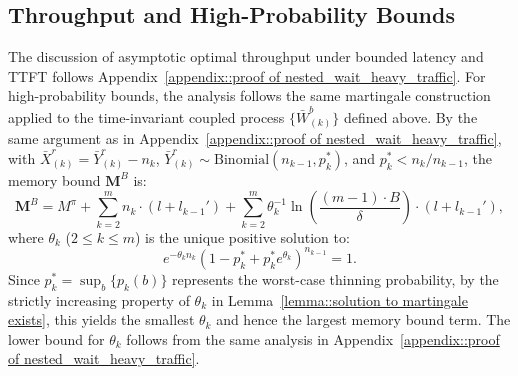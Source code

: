 \subsection{Throughput and High-Probability Bounds}

The discussion of asymptotic optimal throughput under bounded latency and TTFT follows Appendix~\ref{appendix::proof of nested_wait_heavy_traffic}. For high-probability bounds, the analysis follows the same martingale construction applied to the time-invariant coupled process $\{ \bar{W}_{(k)}^b \}$ defined above. By the same argument as in Appendix~\ref{appendix::proof of nested_wait_heavy_traffic}, with $\bar{X}_{(k)}^{r} = \bar{Y}_{(k)}^r - n_k$, $\bar{Y}_{(k)}^r \sim \text{Binomial}(n_{k-1}, p_k^*)$, and $p_k^*<n_k/n_{k-1}$, the memory bound $\mathbf{M}^B$ is:
$$\mathbf{M}^B = M^{\pi} + \sum_{k=2}^m n_k \cdot (l + l_{k-1}') + \sum_{k=2}^m \theta_k^{-1}\ln\left( \frac{(m - 1) \cdot B}{\delta} \right) \cdot (l + l_{k-1}'),$$
where $\theta_k$ ($2\leq k\leq m$) is the unique positive solution to:
\begin{equation}
e^{-\theta_k n_k} (1 - p_k^* + p_k^* e^{\theta_k})^{n_{k-1}} = 1.\label{eq::eq of theta, time varying}
\end{equation}
Since $p_k^* = \sup_b \{p_k(b)\}$ represents the worst-case thinning probability, by the strictly increasing property of $\theta_k$ in Lemma~\ref{lemma::solution to martingale exists}, this yields the smallest $\theta_k$ and hence the largest memory bound term. The lower bound for $\theta_k$ follows from the same analysis in Appendix~\ref{appendix::proof of nested_wait_heavy_traffic}.
